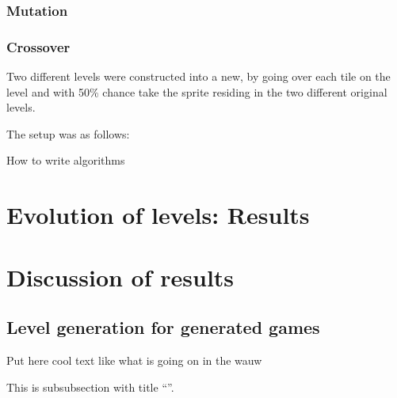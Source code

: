 \documentclass[a4paper,titlepage,final]{report}
\newenvironment{example}[1]
  {\begin{exa}[frametitle=#1]}
  {\end{exa}}
\begin{document}
\subsubsection*{Mutation} 



\subsubsection*{Crossover} 
Two different levels were constructed into a new, by going over each tile on the level and with 50\% chance take the sprite residing in the two different original levels.


The setup was as follows:
\\

\begin{algorithm}[H]
 \caption{How to write algorithms}
\end{algorithm}




\section{Evolution of levels: Results} 
\label{sec_task3evolvingLevelsResults}






\section{Discussion of results} 
\label{sec_task3discussion}






\subsection{Level generation for generated games} 


\begin{example}{The Title}
Put here cool text like what is going on in the wauw
\end{example}
This is subsubsection with title ``\Subsectionname''.




\end{document}
